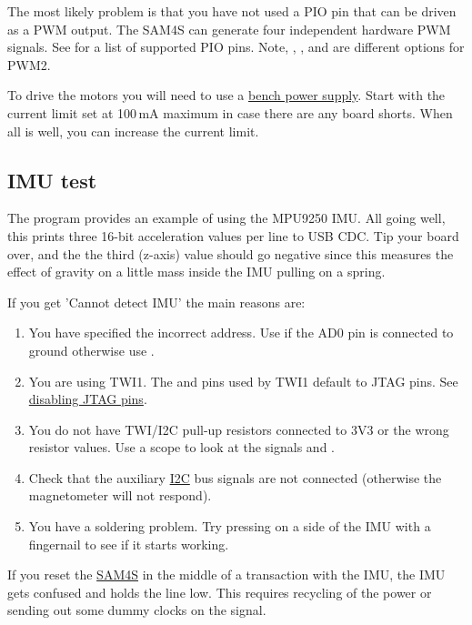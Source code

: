 The most likely problem is that you have not used a PIO pin that can
be driven as a PWM output. The SAM4S can generate four independent
hardware PWM signals. See  for a list of
supported PIO pins. Note, , , and  are
different options for PWM2.

To drive the motors you will need to use a
\href{bench_power_supply}{bench power supply}. Start with the current
limit set at 100\,mA maximum in case there are any board shorts.
When all is well, you can increase the current limit.

\subsection{IMU test}
\label{imu-test}

The program  provides an
example of using the MPU9250 IMU.  All going well, this prints three
16-bit acceleration values per line to USB CDC. Tip your board over,
and the the third (z-axis) value should go negative since this
measures the effect of gravity on a little mass inside the IMU pulling
on a spring.

If you get 'Cannot detect IMU' the main reasons are:

\begin{enumerate}
\item
  You have specified the incorrect address. Use  if the
  AD0 pin is connected to ground otherwise use .
\item
  You are using TWI1. The  and  pins used by TWI1 default to JTAG
  pins. See \protect\hyperref[disabling-jtag-pins]{disabling JTAG pins}.
\item
  You do not have TWI/I2C pull-up resistors connected to 3V3 or the
  wrong resistor values. Use a scope to look at the signals 
  and .
\item
  Check that the auxiliary \url{I2C} bus signals are not connected
  (otherwise the magnetometer will not respond).  
\item
  You have a soldering problem. Try pressing on a side of the IMU with a
  fingernail to see if it starts working.
\end{enumerate}

If you reset the \url{SAM4S} in the middle of a transaction with the
IMU, the IMU gets confused and holds the  line low. This
requires recycling of the power or sending out some dummy clocks on
the  signal.


